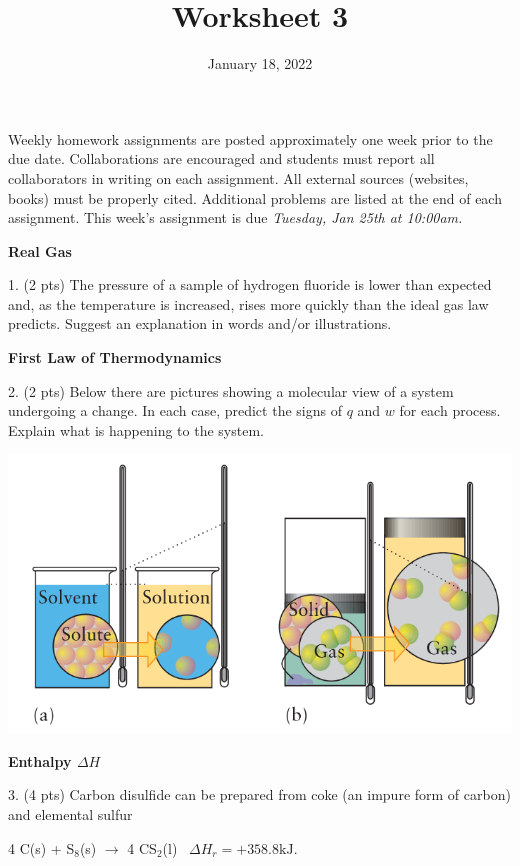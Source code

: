 \documentclass[11pt]{article}
\title{\textbf{Worksheet 3}}
\date{\vspace{-2em}January 18, 2022}
\begin{document}
\maketitle

Weekly homework assignments are posted approximately one week prior to the
due date. Collaborations are encouraged and students must report all collaborators
in writing on each assignment. All external sources (websites, books) must be
properly cited. Additional problems are listed at the end of each assignment.
This week's assignment is due \textit{Tuesday, Jan 25th at 10:00am.}

\textbf{Real Gas}

1. (2 pts) The pressure of a sample of hydrogen fluoride is lower than expected and, as the
temperature is increased, rises more quickly than the ideal gas law predicts.
Suggest an explanation in words and/or illustrations.

\vspace{1in}

\textbf{First Law of Thermodynamics}

2. (2 pts) Below there are pictures showing a molecular view of a system
undergoing a change. In each case, predict the signs of $q$ and $w$ for
 each process. Explain what is happening to the system.

\begin{center}
  \includegraphics[scale=0.35]{phase_change.png}
\end{center}

\vspace{1.5in}

\textbf{Enthalpy $\Delta H$}

3. (4 pts) Carbon disulfide can be prepared from coke (an impure form of carbon) and
elemental sulfur

\begin{center}
  4 C(s) + S$_8$(s) $\rightarrow$ 4 CS$_2$(l) \, $\Delta H_r = +358.8\text{kJ}$.
\end{center}
\end{document}
